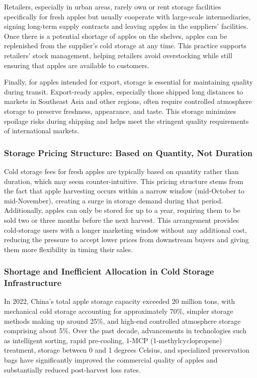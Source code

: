 Retailers, especially in urban areas, rarely own or rent storage facilities specifically for fresh apples but usually cooperate with large-scale intermediaries, signing long-term supply contracts and leaving apples in the suppliers' facilities. Once there is a potential shortage of apples on the shelves, apples can be replenished from the supplier's cold storage at any time. This practice supports retailers' stock management, helping retailers avoid overstocking while still ensuring that apples are available to customers.

Finally, for apples intended for export, storage is essential for maintaining quality during transit. Export-ready apples, especially those shipped long distances to markets in Southeast Asia and other regions, often require controlled atmosphere storage to preserve freshness, appearance, and taste. This storage minimizes spoilage risks during shipping and helps meet the stringent quality requirements of international markets.




\subsubsection{Storage Pricing Structure: Based on Quantity, Not Duration} 
\noindent Cold storage fees for fresh apples are typically based on quantity rather than duration, which may seem counter-intuitive. This pricing structure stems from the fact that apple harvesting occurs within a narrow window (mid-October to mid-November), creating a surge in storage demand during that period. Additionally, apples can only be stored for up to a year, requiring them to be sold two or three months before the next harvest. This arrangement provides cold-storage users with a longer marketing window without any additional cost, reducing the pressure to accept lower prices from downstream buyers and giving them more flexibility in timing their sales.

\subsubsection{Shortage and Inefficient Allocation in Cold Storage Infrastructure} 
\noindent In 2022, China's total apple storage capacity exceeded 20 million tons, with mechanical cold storage accounting for approximately 70\%, simpler storage methods making up around 25\%, and high-end controlled atmosphere storage comprising about 5\%. Over the past decade, advancements in technologies such as intelligent sorting, rapid pre-cooling, 1-MCP (1-methylcyclopropene) treatment, storage between 0 and 1 degrees Celsius, and specialized preservation bags have significantly improved the commercial quality of apples and substantially reduced post-harvest loss rates.


